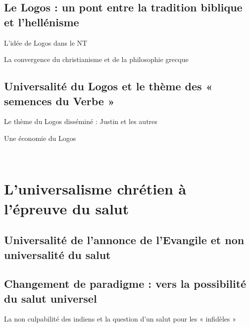    
    
    \subsection{Le Logos : un pont entre la tradition biblique et
    l'hellénisme}
    

  

     
      
      L'idée de Logos dans le NT
      
     
      
      La convergence du christianisme et de la philosophie grecque
      
  
   
    
    \subsection{Universalité du Logos et le thème des « semences du Verbe »}
    

  

     
      
      Le thème du Logos disséminé : Justin et les autres
      
     
      
      Une économie du Logos
      
  

  ~

  \section{L'universalisme chrétien à l'épreuve du
  salut} 



   
    
    \subsection{Universalité de l'annonce de l'Evangile et non universalité du
    salut}
    
   
    
    \subsection{Changement de paradigme : vers la possibilité du salut
    universel}
    

  

     
      
      La non culpabilité des indiens et la question d'un salut pour les
      « infidèles »
      
